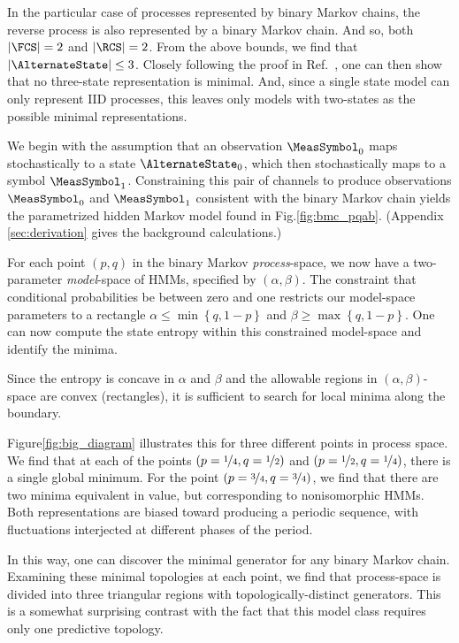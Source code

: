 \documentclass[final,nofootinbib,aps,pre,twocolumn,showpacs,groupaddress,preprintnumbers,floatfix]{revtex4-1}
\begin{document}
In the particular case of processes represented by binary Markov chains, the
reverse process is also represented by a binary Markov chain. And so, both
$|\FCS| = 2$ and $|\RCS| = 2$. From the above bounds, we find that
$|\AlternateState| \leq 3$. Closely following the proof in
Ref.~\cite{kumar2014exact}, one can then show that no three-state
representation is minimal. And, since a single state model can only represent
IID processes, this leaves only models with two-states as the possible minimal representations.

We begin with the assumption that an observation $\MeasSymbol_0$ maps
stochastically to a state $\AlternateState_0$, which then stochastically maps
to a symbol $\MeasSymbol_1$. Constraining this pair of channels to produce
observations $\MeasSymbol_0$ and $\MeasSymbol_1$ consistent with the binary
Markov chain yields the parametrized hidden Markov model found in
Fig.\nobreakspace \ref {fig:bmc_pqab}. (Appendix \ref{sec:derivation} gives the background calculations.)

For each point $(p,q)$ in the binary Markov \emph{process}-space, we now have a
two-parameter \emph{model}-space of HMMs, specified by $(\alpha, \beta)$. The
constraint that conditional probabilities be between zero and one restricts our
model-space parameters to a rectangle $\alpha \leq \min\left\{q, 1-p \right\}$
and $\beta \geq \max\left\{ q, 1-p \right\}$. One can now compute the state
entropy within this constrained model-space and identify the minima.

Since the entropy is concave in $\alpha$ and $\beta$ and the allowable regions
in $(\alpha, \beta)$-space are convex (rectangles), it is sufficient to search
for local minima along the boundary.

Figure\nobreakspace \ref {fig:big_diagram} illustrates this for three different points in process
space. We find that at each of the points $(p=\nicefrac{1}{4},
q=\nicefrac{1}{2})$ and $(p=\nicefrac{1}{2}, q=\nicefrac{1}{4})$, there is a
single global minimum. For the point $(p=\nicefrac{3}{4}, q=\nicefrac{3}{4})$,
we find that there are two minima equivalent in value, but corresponding to
nonisomorphic HMMs. Both representations are biased toward producing a periodic
sequence, with fluctuations interjected at different phases of the period.

In this way, one can discover the minimal generator for any binary Markov
chain. Examining these minimal topologies at each point, we find that
process-space is divided into three triangular regions with
topologically-distinct generators. This is a somewhat surprising contrast with
the fact that this model class requires only one predictive topology.
\end{document}
